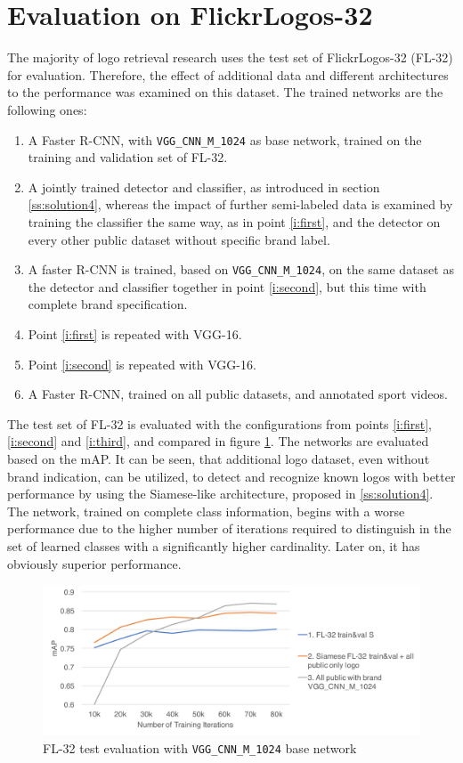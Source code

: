\section{Evaluation on FlickrLogos-32}\label{s:fleval}
The majority of logo retrieval research uses the test set of FlickrLogos-32 (FL-32) for evaluation. Therefore, the effect of additional data and different architectures to the performance was examined on this dataset. The trained networks are the following ones:
\begin{enumerate}
    \item\label{i:first} A Faster R-CNN, with \texttt{VGG\_CNN\_M\_1024} as base network, trained on the training and validation set of FL-32.
    \item\label{i:second} A jointly trained detector and classifier, as introduced in section \ref{ss:solution4}, whereas the impact of further semi-labeled data is examined by training the classifier the same way, as in point \ref{i:first}, and the detector on every other public dataset without specific brand label.
    \item\label{i:third} A faster R-CNN is trained, based on \texttt{VGG\_CNN\_M\_1024}, on the same dataset as the detector and classifier together in point \ref{i:second}, but this time with complete brand specification.
    \item Point \ref{i:first} is repeated with VGG-16.
    \item Point \ref{i:second} is repeated with VGG-16.
    \item A Faster R-CNN, trained on all public datasets, and annotated sport videos.
\end{enumerate}

The test set of FL-32 is evaluated with the configurations from points \ref{i:first}, \ref{i:second} and \ref{i:third}, and compared in figure \ref{f:vggcnnmfltest}. The networks are evaluated based on the mAP. It can be seen, that additional logo dataset, even without brand indication, can be utilized, to detect and recognize known logos with better performance by using the Siamese-like architecture, proposed in \ref{ss:solution4}. The network, trained on complete class information, begins with a worse performance due to the higher number of iterations required to distinguish in the set of learned classes with a significantly higher cardinality. Later on, it has obviously superior performance.

\begin{figure}
  \centering
  \includegraphics[width=150mm]{images/mt/vggcnnmfltest.pdf}
  \caption{FL-32 test evaluation with \texttt{VGG\_CNN\_M\_1024} base network}
  \label{f:vggcnnmfltest}
\end{figure}

